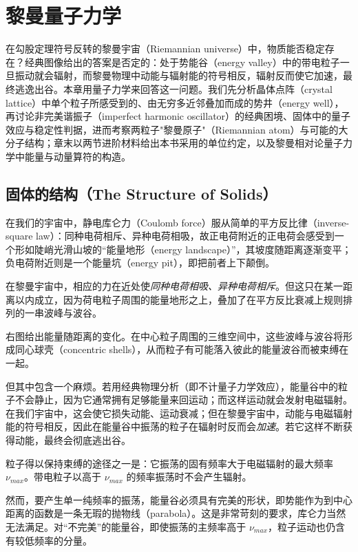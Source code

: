 \chapter{黎曼量子力学}

在勾股定理符号反转的黎曼宇宙（Riemannian universe）中，物质能否稳定存在？经典图像给出的答案是否定的：处于势能谷（energy valley）中的带电粒子一旦振动就会辐射，而黎曼物理中动能与辐射能的符号相反，辐射反而使它加速，最终逃逸出谷。本章用量子力学来回答这一问题。我们先分析晶体点阵（crystal lattice）中单个粒子所感受到的、由无穷多近邻叠加而成的势井（energy well），再讨论非完美谐振子（imperfect harmonic oscillator）的经典困境、固体中的量子效应与稳定性判据，进而考察两粒子"黎曼原子"（Riemannian atom）与可能的大分子结构；章末以两节进阶材料给出本书采用的单位约定，以及黎曼相对论量子力学中能量与动量算符的构造。

\section{固体的结构（The Structure of Solids）}

在我们的宇宙中，静电库仑力（Coulomb force）服从简单的平方反比律（inverse-square law）：同种电荷相斥、异种电荷相吸，故正电荷附近的正电荷会感受到一个形如陡峭光滑山坡的“能量地形（energy landscape）”，其坡度随距离逐渐变平；负电荷附近则是一个能量坑（energy pit），即把前者上下颠倒。

在黎曼宇宙中，相应的力在近处使\emph{同种电荷相吸、异种电荷相斥}。但这只在某一距离以内成立，因为荷电粒子周围的能量地形之上，叠加了在平方反比衰减上规则排列的一串波峰与波谷。


右图给出能量随距离的变化。在中心粒子周围的三维空间中，这些波峰与波谷将形成同心球壳（concentric shells），从而粒子有可能落入彼此的能量波谷而被束缚在一起。

但其中包含一个麻烦。若用经典物理分析（即不计量子力学效应），能量谷中的粒子不会静止，因为它通常拥有足够能量来回运动；而这样运动就会发射电磁辐射。在我们宇宙中，这会使它损失动能、运动衰减；但在黎曼宇宙中，动能与电磁辐射能的符号相反，因此在能量谷中振荡的粒子在辐射时反而会\emph{加速}。若它这样不断获得动能，最终会彻底逃出谷。

粒子得以保持束缚的途径之一是：它振荡的固有频率大于电磁辐射的最大频率 $\nu_{max}$。带电粒子以高于 $\nu_{max}$ 的频率振荡时不会产生辐射。

然而，要产生单一纯频率的振荡，能量谷必须具有完美的形状，即势能作为到中心距离的函数是一条无瑕的抛物线（parabola）。这是非常苛刻的要求，库仑力当然无法满足。对“不完美”的能量谷，即使振荡的主频率高于 $\nu_{max}$，粒子运动也仍含有较低频率的分量。

